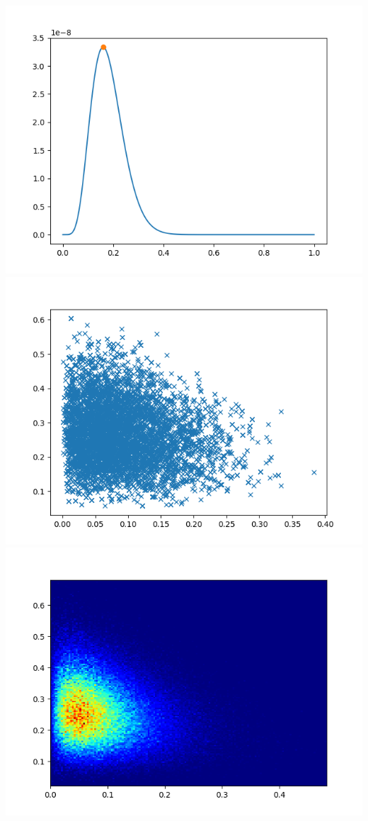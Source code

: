 \documentclass[pt12]{article}
\begin{document}
\newpage

\begin{center}
\includegraphics[scale=0.5]{hip4.png}\\
\includegraphics[scale=0.5]{sc4.png}\\
\includegraphics[scale=0.5]{den4.png}\\
\end{center}
\end{document}
